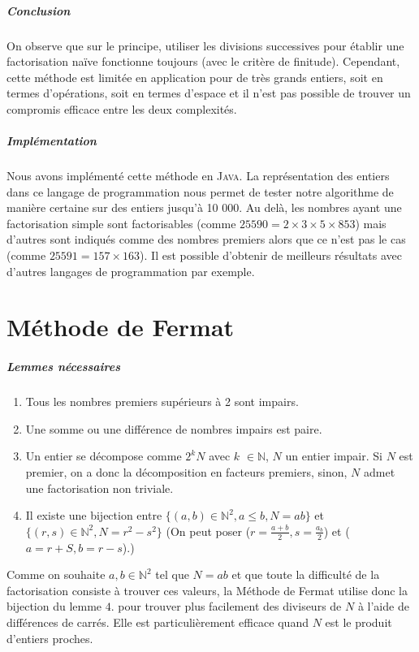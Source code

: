 \documentclass[11pt,a4paper]{article}
\begin{document}
	\subparagraph{Conclusion}
	
	On observe que sur le principe, utiliser les divisions successives pour établir une factorisation naïve fonctionne toujours (avec le critère de finitude). Cependant, cette méthode est limitée en application pour de très grands entiers, soit en termes d'opérations, soit en termes d'espace et il n'est pas possible de trouver un compromis efficace entre les deux complexités.
	
	\subparagraph{Implémentation}
	Nous avons implémenté cette méthode en \textsc{Java}. La représentation des entiers dans ce langage de programmation nous permet de tester notre algorithme de manière certaine sur des entiers jusqu'à 10 000. Au delà, les nombres ayant une factorisation simple sont factorisables (comme $25590 = 2 \times 3 \times 5 \times 853$) mais d'autres sont indiqués comme des nombres premiers alors que ce n'est pas le cas (comme $25591 = 157 \times 163 $). Il est possible d'obtenir de meilleurs résultats avec d'autres langages de programmation par exemple.
	
	\newpage
	
	\section{\LARGE{Méthode de Fermat}}
	
	\subparagraph{Lemmes nécessaires}
	\begin{enumerate}
		\item Tous les nombres premiers supérieurs à 2 sont impairs.
		
		\item Une somme ou une différence de nombres impairs est paire.
		
		\item Un entier se décompose comme $2^{k}N$ avec $\mathit{k}$ $\in\mathbb{N}$, $\mathit{N}$ un entier impair. Si $\mathit{N}$ est premier, on a donc la décomposition en facteurs premiers, sinon, $\mathit{N}$ admet une factorisation non triviale.
		
		\item Il existe une bijection entre ${\{(a,b) \in \mathbb{N}^2, a \leq b, N = ab\}}$ et $\{(r,s) \in \mathbb{N}^2, N = r^2 - s^2\}$ 
		(On peut poser ($r = \frac{a+b}{2}, s = \frac{a_b}{2}$) et ($a=r+S , b = r-s$).)
	\end{enumerate}
	
	Comme on souhaite $a,b \in \mathbb{N}^2$ tel que $N = ab$ et que toute la difficulté de la factorisation consiste à trouver ces valeurs, la Méthode de Fermat utilise donc la bijection du lemme $4.$ pour trouver plus facilement des diviseurs de $N$ à l'aide de différences de carrés. Elle est particulièrement efficace quand $N$ est le produit d'entiers proches.
	
\end{document}
